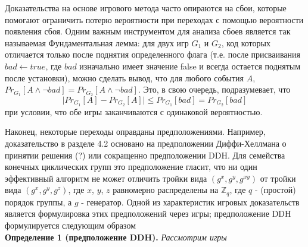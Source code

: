 \documentclass[a4paper,12pt]{report}
\begin{document}
\par
Доказательства на основе игрового метода часто опираются на сбои, которые помогают ограничить потерю вероятности при переходах с помощью вероятности появления сбоя. Одним важным инструментом для анализа сбоев является так называемая Фундаментальная лемма: для двух игр $G_1$ и $G_2$, код которых отличается только после поднятия определенного флага (т.е. после присваивания $bad \gets true$, где $bad$ изначально имеет значение false и всегда остается поднятым после установки), можно сделать вывод, что для любого события $A$, $Pr_{G_1}[A \wedge \neg bad] = Pr_{G_2}[A \wedge \neg bad]$. Это, в свою очередь, подразумевает, что
\[\lvert Pr_{G_1}[A] - Pr_{G_2}[A] \rvert \leq Pr_{G_1}[bad] = Pr_{G_2}[bad] \]
при условии, что обе игры заканчиваются с одинаковой вероятностью.
\par
Наконец, некоторые переходы оправданы предположениями. Например, доказательство в разделе 4.2 основано на предположении Диффи-Хеллмана о принятии решения (?) или сокращенно предположении DDH. Для семейства конечных циклических групп это предположение гласит, что ни один эффективный алгоритм не может отличить тройки вида $(g^x, g^y, g^{xy})$ от тройки вида $(g^x, g^y, g^z)$, где $x$, $y$, $z$ равномерно распределены на $\mathbb{Z}_q$, где $q$ - (простой) порядок группы, а $g$ - генератор. Одной из характеристик игровых доказательств является формулировка этих предположений через игры; предположение DDH формулируется следующим образом \\ 
\textbf{Определение 1 (предположение DDH).} \textit{Рассмотрим игры}

\begin{figure}[h]
  \centering
  \begin{subfigure}[b]{0.3\textwidth}
    \centering
\end{subfigure}
\begin{subfigure}[b]{0.3\textwidth}
  \centering
\end{subfigure}
\end{figure}
\end{document}
